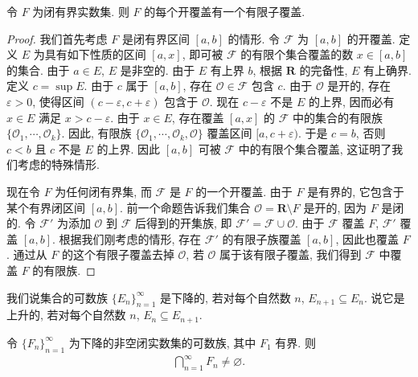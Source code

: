 \documentclass[../../main.tex]{subfiles}
\begin{document}
\begin{theorem}\label{theorem:ch01-HeineBorel}
令 $F$ 为闭有界实数集. 则 $F$ 的每个开覆盖有一个有限子覆盖.
\end{theorem}

\begin{proof}
我们首先考虑 $F$ 是闭有界区间 $[a,b]$ 的情形. 令 $\mathcal{F}$ 为 $[a,b]$ 的开覆盖. 定义 $E$ 为具有如下性质的区间 $[a,x]$, 即可被 $\mathcal{F}$ 的有限个集合覆盖的数 $x\in[a,b]$ 的集合. 由于 $a\in E$, $E$ 是非空的. 由于 $E$ 有上界 $b$, 根据 $\mathbf{R}$ 的完备性, $E$ 有上确界. 定义 $c=\sup E$. 由于 $c$ 属于 $[a,b]$, 存在 $\mathcal{O}\in\mathcal{F}$ 包含 $c$. 由于 $\mathcal{O}$ 是开的, 存在 $\varepsilon>0$, 使得区间 $(c-\varepsilon,c+\varepsilon)$ 包含于 $\mathcal{O}$. 现在 $c-\varepsilon$ 不是 $E$ 的上界, 因而必有 $x\in E$ 满足 $x>c-\varepsilon$. 由于 $x\in E$, 存在覆盖 $[a,x]$ 的 $\mathcal{F}$ 中的集合的有限族 $\{\mathcal{O}_{1},\cdots,\mathcal{O}_{k}\}$. 因此, 有限族 $\{\mathcal{O}_{1},\cdots,\mathcal{O}_{k},\mathcal{O}\}$ 覆盖区间 $[a,c+\varepsilon)$. 于是 $c=b$, 否则 $c<b$ 且 $c$ 不是 $E$ 的上界. 因此 $[a,b]$ 可被 $\mathcal{F}$ 中的有限个集合覆盖, 这证明了我们考虑的特殊情形.

现在令 $F$ 为任何闭有界集, 而 $\mathcal{F}$ 是 $F$ 的一个开覆盖. 由于 $F$ 是有界的, 它包含于某个有界闭区间 $[a,b]$. 前一个命题告诉我们集合 $\mathcal{O}=\mathbf{R}\setminus F$ 是开的, 因为 $F$ 是闭的. 令 $\mathcal{F}'$ 为添加 $\mathcal{O}$ 到 $\mathcal{F}$ 后得到的开集族, 即 $\mathcal{F}'=\mathcal{F}\cup\mathcal{O}$. 由于 $\mathcal{F}$ 覆盖 $F$, $\mathcal{F}'$ 覆盖 $[a,b]$. 根据我们刚考虑的情形, 存在 $\mathcal{F}'$ 的有限子族覆盖 $[a,b]$, 因此也覆盖 $F$. 通过从 $F$ 的这个有限子覆盖去掉 $\mathcal{O}$, 若 $\mathcal{O}$ 属于该有限子覆盖, 我们得到 $\mathcal{F}$ 中覆盖 $F$ 的有限族.
\end{proof}

我们说集合的可数族 $\{E_{n}\}_{n=1}^{\infty}$ 是下降的, 若对每个自然数 $n$, $E_{n+1}\subseteq E_{n}$. 说它是上升的, 若对每个自然数 $n$, $E_{n}\subseteq E_{n+1}$.

\begin{theorem}[集套定理]\label{theorem:ch01-集套}
令 $\{F_{n}\}_{n=1}^{\infty}$ 为下降的非空闭实数集的可数族, 其中 $F_{1}$ 有界. 则
\begin{align*}
\bigcap_{n=1}^{\infty}F_{n}\neq\varnothing.
\end{align*}
\end{theorem}
\end{document}
